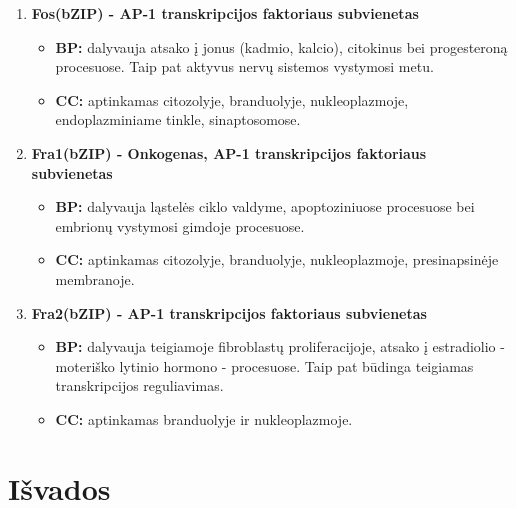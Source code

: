\documentclass[12pt]{article}
\begin{document}
\begin{enumerate}
    \item \textbf{Fos(bZIP)\cite{FOS} - AP-1 transkripcijos
                  faktoriaus subvienetas}
        \begin{itemize}
            \item \textbf{BP:} dalyvauja atsako į jonus (kadmio, kalcio),
                citokinus bei progesteroną procesuose. Taip pat aktyvus nervų
                sistemos vystymosi metu.
            \item \textbf{CC:} aptinkamas citozolyje, branduolyje,
                nukleoplazmoje, endoplazminiame tinkle, sinaptosomose.
        \end{itemize}

    \item \textbf{Fra1(bZIP)\cite{FRA1} - Onkogenas, AP-1 transkripcijos
                  faktoriaus subvienetas}
        \begin{itemize}
            \item \textbf{BP:} dalyvauja ląstelės ciklo valdyme, apoptoziniuose
                procesuose bei embrionų vystymosi gimdoje procesuose.
            \item \textbf{CC:} aptinkamas citozolyje, branduolyje,
                nukleoplazmoje, presinapsinėje membranoje.
        \end{itemize}

    \item \textbf{Fra2(bZIP)\cite{FRA2} - AP-1 transkripcijos
                  faktoriaus subvienetas}
        \begin{itemize}
            \item \textbf{BP:} dalyvauja teigiamoje fibroblastų
                proliferacijoje, atsako į estradiolio - moteriško
                lytinio hormono - procesuose. Taip pat būdinga teigiamas
                transkripcijos reguliavimas.
            \item \textbf{CC:} aptinkamas branduolyje ir nukleoplazmoje.
        \end{itemize}
\end{enumerate}

\newpage


\section{Išvados}

\newpage

\end{document}
